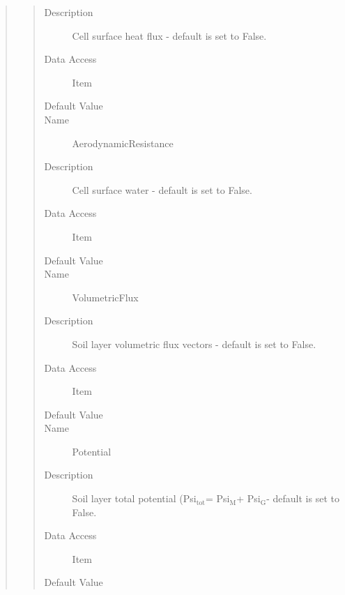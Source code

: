 \documentclass[letterpaper,10pt,english]{sphinxmanual}
\begin{document}
\begin{quote}
\begin{description}
\begin{quote}
\begin{description}
\item[{Description}] \leavevmode
Cell surface heat flux - default is set to False.

\item[{Data Access}] \leavevmode
Item

\item[{Default Value}] \leavevmode
{}

\item[{Name}] \leavevmode
AerodynamicResistance

\item[{Description}] \leavevmode
Cell surface water - default is set to False.

\item[{Data Access}] \leavevmode
Item

\item[{Default Value}] \leavevmode
{}

\item[{Name}] \leavevmode
VolumetricFlux

\item[{Description}] \leavevmode
Soil layer volumetric flux vectors - default is set to False.

\item[{Data Access}] \leavevmode
Item

\item[{Default Value}] \leavevmode
{}

\item[{Name}] \leavevmode
Potential

\item[{Description}] \leavevmode
Soil layer total potential (Psi$_{\text{tot}}$= Psi$_{\text{M}}$+ Psi$_{\text{G}}$- default is set to False.

\item[{Data Access}] \leavevmode
Item

\item[{Default Value}] \leavevmode
{}


\end{description}
\end{quote}
\end{description}
\end{quote}
\end{document}
